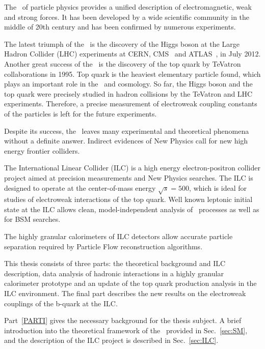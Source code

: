 
The \sm\ of particle physics provides a unified description of electromagnetic, weak and strong forces. It has been developed by a wide scientific community in the middle of 20th century and has been confirmed by numerous experiments. 

The latest triumph of the \sm\ is the discovery of the Higgs boson at the Large Hadron Collider (LHC) experiments at CERN, CMS~\cite{bib:HiggsCms} and ATLAS~\cite{bib:HiggsAtlas}, in July 2012.
Another great success of the \sm\ is the discovery of the top quark by TeVatron collaborations in 1995. Top quark is the heaviest elementary particle found, which plays an important role in the \sm\ and cosmology. 
So far, the Higgs boson and the top quark were precisely studied in hadron collisions by the TeVatron and LHC experiments. Therefore, a precise measurement of electroweak coupling constants of the particles is left for the future experiments.

Despite its success, the \sm\ leaves many experimental and theoretical phenomena without a definite answer. 
Indirect evidences of New Physics call for new high energy frontier colliders.

The International Linear Collider \cite{bib:ILC} (ILC) is a high energy electron-positron collider project aimed at precision measurements and New Physics searches. 
The ILC is designed to operate at the center-of-mass energy $\sqrt{s}=500$\gev, which is ideal for studies of electroweak interactions of the top quark. 
Well known leptonic initial state at the ILC allows clean, model-independent analysis of \sm\ processes as well as for BSM searches. 

The highly granular calorimeters of ILC detectors allow accurate particle separation required by Particle Flow reconstruction algorithms.

This thesis consists of three parts: the theoretical background and ILC description, data analysis of hadronic interactions in a highly granular calorimeter prototype and an update of the top quark production analysis in the ILC environment.
The final part describes the new results on the electroweak couplings of the b-quark at the ILC.

Part~\ref{PARTI} gives the necessary background for the thesis subject. A brief introduction into the theoretical framework of the \sm\ provided in Sec.~\ref{sec:SM}, and the description of the ILC project is described in Sec.~\ref{sec:ILC}.

